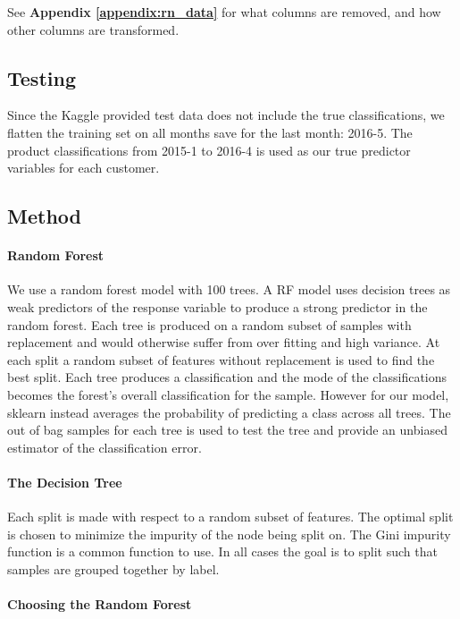 \documentclass{article}
\begin{document}
\begin{spacing}{1}
\begin{large}
See \textbf{Appendix \ref{appendix:rn_data}} for what columns are removed, and how other columns are transformed.


\subsection{Testing}
Since the Kaggle provided test data does not include the true classifications, we flatten the training set on all months save for the last month: 2016-5. The product classifications from 2015-1 to 2016-4 is used as our true predictor variables for each customer.

\subsection{Method}

\paragraph{Random Forest}
We use a random forest model with 100 trees. A RF model uses decision trees as weak predictors of the response variable to produce a strong predictor in the random forest. Each tree is produced on a random subset of samples with replacement and would otherwise suffer from over fitting and high variance. At each split a random subset of features without replacement is used to find the best split. Each tree produces a classification and the mode of the classifications becomes the forest's overall classification for the sample. However for our model, sklearn instead averages the probability of predicting a class across all trees.\cite{rnSKlearn}  The out of bag samples for each tree is used to test the tree and provide an unbiased estimator of the classification error.\cite{rnLeo}

\paragraph{The Decision Tree}
Each split is made with respect to a random subset of features. The optimal split is chosen to minimize the impurity of the node being split on. The Gini impurity function is a common function to use. In all cases the goal is to split such that samples are grouped together by label.

\paragraph{Choosing the Random Forest}


\end{large}
\end{spacing}
\end{document}
